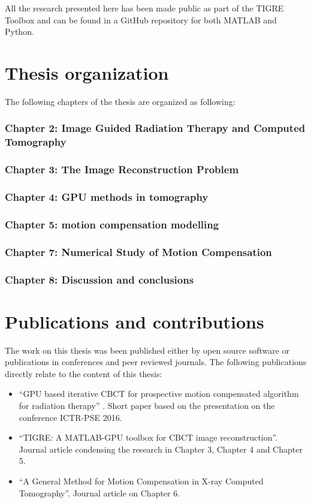 All the research presented here has been made public as part of the TIGRE Toolbox\cite{TIGRE} and can be found in a GitHub repository\cite{TIGREweb} for both MATLAB and Python. 

\section{Thesis organization}

The following chapters of the thesis are organized as following:

\subsubsection{Chapter 2: Image Guided Radiation Therapy and Computed Tomography}
\subsubsection{Chapter 3: The Image Reconstruction Problem}
\subsubsection{Chapter 4: GPU methods in tomography}
\subsubsection{Chapter 5: motion compensation modelling}
\subsubsection{Chapter 7: Numerical Study of Motion Compensation}
\subsubsection{Chapter 8: Discussion and conclusions}

\section{Publications and contributions}

The work on this thesis was been published either by open source software or publications in conferences and peer reviewed journals. The following publications directly relate to the content of this thesis:

\begin{itemize}
\item ``GPU based iterative CBCT for prospective motion compensated algorithm for radiation therapy''\cite{biguri2016gpu} . Short paper based on the presentation on the conference ICTR-PSE 2016.
\item ``TIGRE: A MATLAB-GPU toolbox for CBCT image reconstruction''\cite{TIGRE}. Journal article condensing the research in Chapter 3, Chapter 4 and Chapter 5.
\item  ``A General Method for Motion Compensation in X-ray Computed Tomography''\cite{biguri2017general}. Journal article on Chapter 6.
\end{itemize}

